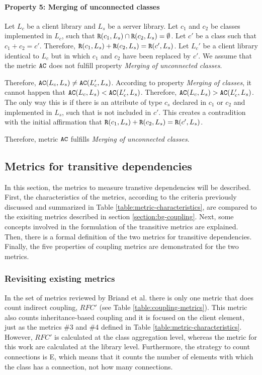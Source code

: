 \paragraph{Property 5: Merging of unconnected classes}
Let $L_c$ be a client library and $L_s$ be a server library. Let $c_1$ and $c_2$ be classes implemented in $L_c$, such that $\verb|R|(c_1, L_s) \cap \verb|R|(c_2, L_s) = \emptyset$. Let $c'$ be a class such that $c_1 + c_2 = c'$. Therefore, $\verb|R|(c_1, L_s) + \verb|R|(c_2, L_s) = \verb|R|(c', L_s)$. Let $L_c'$ be a client library identical to $L_c$ but in which $c_1$ and $c_2$ have been replaced by $c'$. We assume that the metric $\verb|AC|$ does not fulfill property \textit{Merging of unconnected classes}.

Therefore, $\verb|AC|(L_c, L_s) \neq \verb|AC|(L_c', L_s)$. According to property \textit{Merging of classes}, it cannot happen that $\verb|AC|(L_c, L_s) < \verb|AC|(L_c', L_s)$. Therefore, $\verb|AC|(L_c, L_s) > \verb|AC|(L_c', L_s)$. The only way this is if there is an attribute of type $c_s$ declared in $c_1$ or $c_2$ and implemented in $L_s$, such that is not included in $c'$. This creates a contradition with the initial affirmation that $\verb|R|(c_1, L_s) + \verb|R|(c_2, L_s) = \verb|R|(c', L_s)$.

Therefore, metric $\verb|AC|$ fulfills \textit{Merging of unconnected classes}.

\subsection{Metrics for transitive dependencies}\label{subsect:defMetricsTransitive}
In this section, the metrics to measure transtive dependencies will be described. First, the characteristics of the metrics, according to the criteria previously discussed and summarized in Table \ref{table:metric-characteristics}, are compared to the exisiting metrics described in section \ref{section:bg-coupling}. Next, some concepts involved in the formulation of the transitive metrics are explained. Then, there is a formal definition of the two metrics for transitive dependencies. Finally, the five properties of coupling metrics are demonstrated for the two metrics.

\subsubsection{Revisiting existing metrics}
In the set of metrics reviewed by Briand et al. \cite{briand1999unified} there is only one metric that does count indirect coupling, $RFC'$ (see Table \ref{table:coupling-metrics}). This metric also counts inheritance-based coupling and it is focused on the client element, just as the metrics \#3 and \#4 defined in Table \ref{table:metric-characteristics}. However, $RFC'$ is calculated at the class aggregation level, whereas the metric for this work are calculated at the library level. Furthermore, the strategy to count connections is E, which means that it counts the number of elements with which the class has a connection, not how many connections.

